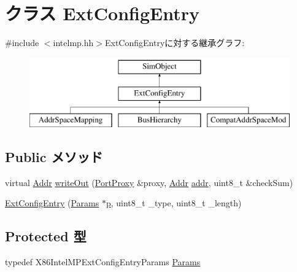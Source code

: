 \hypertarget{classX86ISA_1_1IntelMP_1_1ExtConfigEntry}{
\section{クラス ExtConfigEntry}
\label{classX86ISA_1_1IntelMP_1_1ExtConfigEntry}
}


{\ttfamily \#include $<$intelmp.hh$>$}ExtConfigEntryに対する継承グラフ:\begin{figure}[H]
\begin{center}
\leavevmode
\includegraphics[height=3cm]{classX86ISA_1_1IntelMP_1_1ExtConfigEntry}
\end{center}
\end{figure}
\subsection*{Public メソッド}
\begin{DoxyCompactItemize}
\item 
virtual \hyperlink{base_2types_8hh_af1bb03d6a4ee096394a6749f0a169232}{Addr} \hyperlink{classX86ISA_1_1IntelMP_1_1ExtConfigEntry_a5fffc1006b1f28bd779d83ffbe213b4f}{writeOut} (\hyperlink{classPortProxy}{PortProxy} \&proxy, \hyperlink{base_2types_8hh_af1bb03d6a4ee096394a6749f0a169232}{Addr} \hyperlink{namespaceX86ISA_ab705917f60c5566f9ce56a93f798b2e2}{addr}, uint8\_\-t \&checkSum)
\item 
\hyperlink{classX86ISA_1_1IntelMP_1_1ExtConfigEntry_a43351247a3aaa41f6efa41834a1e1e39}{ExtConfigEntry} (\hyperlink{classX86ISA_1_1IntelMP_1_1ExtConfigEntry_ac05617332b889b2a33387663c048f2a9}{Params} $\ast$\hyperlink{namespaceX86ISA_af675c1d542a25b96e11164b80809a856}{p}, uint8\_\-t \_\-type, uint8\_\-t \_\-length)
\end{DoxyCompactItemize}
\subsection*{Protected 型}
\begin{DoxyCompactItemize}
\item 
typedef X86IntelMPExtConfigEntryParams \hyperlink{classX86ISA_1_1IntelMP_1_1ExtConfigEntry_ac05617332b889b2a33387663c048f2a9}{Params}
\end{DoxyCompactItemize}
